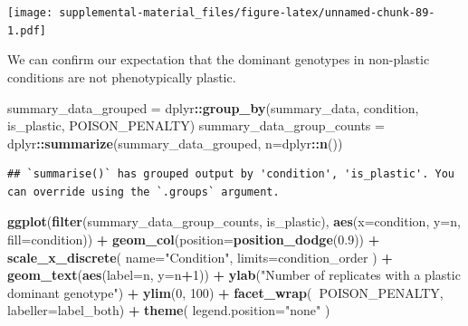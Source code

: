 \documentclass[]{book}
\newenvironment{Shaded}{\begin{snugshade}}{\end{snugshade}}
\newcommand{\DataTypeTok}[1]{\textcolor[rgb]{0.13,0.29,0.53}{#1}}
\newcommand{\DecValTok}[1]{\textcolor[rgb]{0.00,0.00,0.81}{#1}}
\newcommand{\FloatTok}[1]{\textcolor[rgb]{0.00,0.00,0.81}{#1}}
\newcommand{\KeywordTok}[1]{\textcolor[rgb]{0.13,0.29,0.53}{\textbf{#1}}}
\newcommand{\NormalTok}[1]{#1}
\newcommand{\OperatorTok}[1]{\textcolor[rgb]{0.81,0.36,0.00}{\textbf{#1}}}
\newcommand{\StringTok}[1]{\textcolor[rgb]{0.31,0.60,0.02}{#1}}
\begin{document}
\texttt{[image: supplemental-material\_files/figure-latex/unnamed-chunk-89-1.pdf]}

We can confirm our expectation that the dominant genotypes in non-plastic conditions are not phenotypically plastic.

\begin{Shaded}
\begin{Highlighting}[]
\NormalTok{summary_data_grouped =}\StringTok{ }\NormalTok{dplyr}\OperatorTok{::}\KeywordTok{group_by}\NormalTok{(summary_data, condition, is_plastic, POISON_PENALTY)}
\NormalTok{summary_data_group_counts =}\StringTok{ }\NormalTok{dplyr}\OperatorTok{::}\KeywordTok{summarize}\NormalTok{(summary_data_grouped, }\DataTypeTok{n=}\NormalTok{dplyr}\OperatorTok{::}\KeywordTok{n}\NormalTok{())}
\end{Highlighting}
\end{Shaded}

\begin{verbatim}
## `summarise()` has grouped output by 'condition', 'is_plastic'. You can override using the `.groups` argument.
\end{verbatim}

\begin{Shaded}
\begin{Highlighting}[]
\KeywordTok{ggplot}\NormalTok{(}\KeywordTok{filter}\NormalTok{(summary_data_group_counts, is_plastic), }\KeywordTok{aes}\NormalTok{(}\DataTypeTok{x=}\NormalTok{condition, }\DataTypeTok{y=}\NormalTok{n, }\DataTypeTok{fill=}\NormalTok{condition)) }\OperatorTok{+}
\StringTok{  }\KeywordTok{geom_col}\NormalTok{(}\DataTypeTok{position=}\KeywordTok{position_dodge}\NormalTok{(}\FloatTok{0.9}\NormalTok{)) }\OperatorTok{+}
\StringTok{  }\KeywordTok{scale_x_discrete}\NormalTok{(}
    \DataTypeTok{name=}\StringTok{"Condition"}\NormalTok{,}
    \DataTypeTok{limits=}\NormalTok{condition_order}
\NormalTok{  ) }\OperatorTok{+}
\StringTok{  }\KeywordTok{geom_text}\NormalTok{(}\KeywordTok{aes}\NormalTok{(}\DataTypeTok{label=}\NormalTok{n, }\DataTypeTok{y=}\NormalTok{n}\OperatorTok{+}\DecValTok{1}\NormalTok{)) }\OperatorTok{+}
\StringTok{  }\KeywordTok{ylab}\NormalTok{(}\StringTok{"Number of replicates with a plastic dominant genotype"}\NormalTok{) }\OperatorTok{+}
\StringTok{  }\KeywordTok{ylim}\NormalTok{(}\DecValTok{0}\NormalTok{, }\DecValTok{100}\NormalTok{) }\OperatorTok{+}
\StringTok{  }\KeywordTok{facet_wrap}\NormalTok{(}\OperatorTok{~}\NormalTok{POISON_PENALTY, }\DataTypeTok{labeller=}\NormalTok{label_both) }\OperatorTok{+}
\StringTok{  }\KeywordTok{theme}\NormalTok{(}
    \DataTypeTok{legend.position=}\StringTok{"none"}
\NormalTok{  )}
\end{Highlighting}
\end{Shaded}
\end{document}
